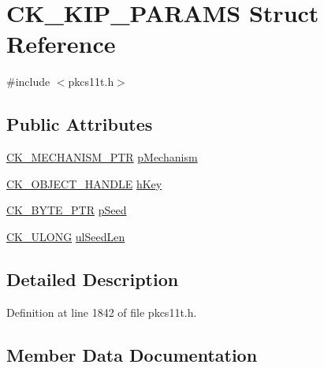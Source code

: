 \hypertarget{struct_c_k___k_i_p___p_a_r_a_m_s}{}\section{C\+K\+\_\+\+K\+I\+P\+\_\+\+P\+A\+R\+A\+MS Struct Reference}
\label{struct_c_k___k_i_p___p_a_r_a_m_s}


{\ttfamily \#include $<$pkcs11t.\+h$>$}

\subsection*{Public Attributes}
\begin{DoxyCompactItemize}
\item 
\hyperlink{pkcs11t_8h_afa4c48ba8a588833ea04f0910583592e}{C\+K\+\_\+\+M\+E\+C\+H\+A\+N\+I\+S\+M\+\_\+\+P\+TR} \hyperlink{struct_c_k___k_i_p___p_a_r_a_m_s_ae2c9f533b73768561ea4fb994342dbf7}{p\+Mechanism}
\item 
\hyperlink{pkcs11t_8h_ad1cdd703196214cd34e6f9f52bc67683}{C\+K\+\_\+\+O\+B\+J\+E\+C\+T\+\_\+\+H\+A\+N\+D\+LE} \hyperlink{struct_c_k___k_i_p___p_a_r_a_m_s_a80217053023d8fcb269e81cf349d6f2f}{h\+Key}
\item 
\hyperlink{pkcs11t_8h_a3d7233a4077fbaf7ae76b64da0a62a21}{C\+K\+\_\+\+B\+Y\+T\+E\+\_\+\+P\+TR} \hyperlink{struct_c_k___k_i_p___p_a_r_a_m_s_aa02cbf703bf4b440204b219576d6872b}{p\+Seed}
\item 
\hyperlink{pkcs11t_8h_a35181858a3b7a0a81f49d180d8f446ef}{C\+K\+\_\+\+U\+L\+O\+NG} \hyperlink{struct_c_k___k_i_p___p_a_r_a_m_s_a6edf93be690ec6b728ffb62de917a5d0}{ul\+Seed\+Len}
\end{DoxyCompactItemize}


\subsection{Detailed Description}


Definition at line 1842 of file pkcs11t.\+h.



\subsection{Member Data Documentation}
\mbox{\label{struct_c_k___k_i_p___p_a_r_a_m_s_a80217053023d8fcb269e81cf349d6f2f}} 
